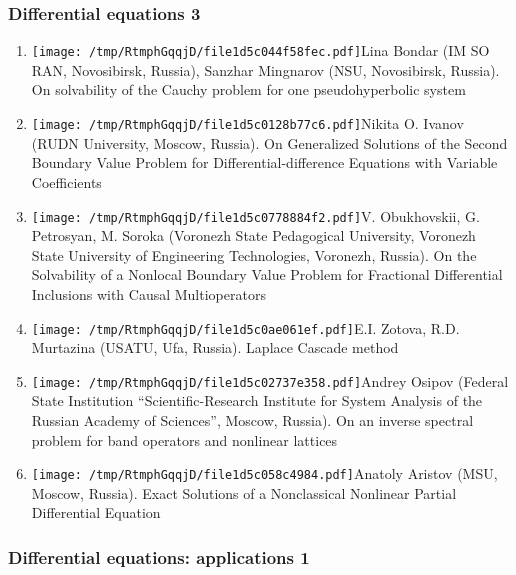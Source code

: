 \documentclass[
]{article}
\providecommand{\tightlist}{%
  \setlength{\itemsep}{0pt}\setlength{\parskip}{0pt}}
\begin{document}
\hypertarget{de3}{%
\subsubsection{Differential equations 3}\label{de3}}

\begin{enumerate}
\def\labelenumi{\arabic{enumi}.}
\tightlist
\item
  \protect\texttt{[image: /tmp/RtmphGqqjD/file1d5c044f58fec.pdf]}Lina
  Bondar (IM SO RAN, Novosibirsk, Russia), Sanzhar Mingnarov (NSU,
  Novosibirsk, Russia). On solvability of the Cauchy problem for one
  pseudohyperbolic system
\item
  \protect\texttt{[image: /tmp/RtmphGqqjD/file1d5c0128b77c6.pdf]}Nikita
  O. Ivanov (RUDN University, Moscow, Russia). On Generalized Solutions
  of the Second Boundary Value Problem for Differential-difference
  Equations with Variable Coefficients
\item
  \protect\texttt{[image: /tmp/RtmphGqqjD/file1d5c0778884f2.pdf]}V.
  Obukhovskii, G. Petrosyan, M. Soroka (Voronezh State Pedagogical
  University, Voronezh State University of Engineering Technologies,
  Voronezh, Russia). On the Solvability of a Nonlocal Boundary Value
  Problem for Fractional Differential Inclusions with Causal
  Multioperators
\item
  \protect\texttt{[image: /tmp/RtmphGqqjD/file1d5c0ae061ef.pdf]}E.I.
  Zotova, R.D. Murtazina (USATU, Ufa, Russia). Laplace Cascade method
\item
  \protect\texttt{[image: /tmp/RtmphGqqjD/file1d5c02737e358.pdf]}Andrey
  Osipov (Federal State Institution ``Scientific-Research Institute for
  System Analysis of the Russian Academy of Sciences'', Moscow, Russia).
  On an inverse spectral problem for band operators and nonlinear
  lattices
\item
  \protect\texttt{[image: /tmp/RtmphGqqjD/file1d5c058c4984.pdf]}Anatoly
  Aristov (MSU, Moscow, Russia). Exact Solutions of a Nonclassical
  Nonlinear Partial Differential Equation
\end{enumerate}

\hypertarget{dea1}{%
\subsubsection{Differential equations: applications 1}\label{dea1}}
\end{document}
